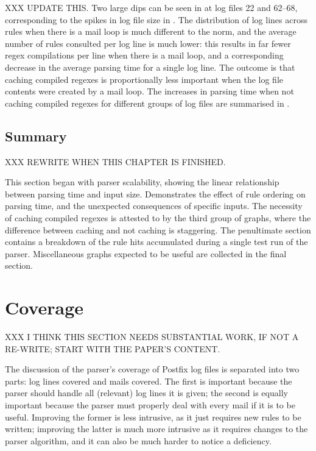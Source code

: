 XXX UPDATE THIS\@.  Two large dips can be seen in  at log files 22 and
62--68, corresponding to the spikes in log file size in .  The distribution of log
lines across rules when there is a mail loop is much different to the norm,
and the average number of rules consulted per log line is much lower: this
results in far fewer regex compilations per line when there is a mail loop,
and a corresponding decrease in the average parsing time for a single log
line.  The outcome is that caching compiled regexes is proportionally less
important when the log file contents were created by a mail loop.  The
increases in parsing time when not caching compiled regexes for different
groups of log files are summarised in .



\subsection{Summary}

XXX REWRITE WHEN THIS CHAPTER IS FINISHED\@.

This section began with parser scalability, showing the linear relationship
between parsing time and input size.  Demonstrates the effect of rule
ordering on parsing time, and the unexpected consequences of specific
inputs.  The necessity of caching compiled regexes is attested to by the
third group of graphs, where the difference between caching and not caching
is staggering.  The penultimate section contains a breakdown of the rule
hits accumulated during a single test run of the parser.  Miscellaneous
graphs expected to be useful are collected in the final section.

\section{Coverage}

XXX I THINK THIS SECTION NEEDS SUBSTANTIAL WORK, IF NOT A RE-WRITE\@; START
WITH THE PAPER'S CONTENT\@.

\label{parsing coverage}

The discussion of the parser's coverage of Postfix log files is separated
into two parts: log lines covered and mails covered.  The first is
important because the parser should handle all (relevant) log lines it is
given; the second is equally important because the parser must properly
deal with every mail if it is to be useful.  Improving the former is
less intrusive, as it just requires new rules to be written; improving the
latter is much more intrusive as it requires changes to the parser
algorithm, and it can also be much harder to notice a deficiency.


